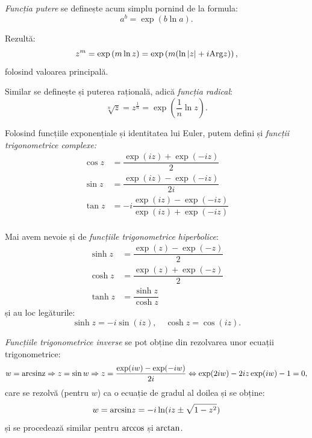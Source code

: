 \emph{Funcția putere} se definește acum simplu pornind de la formula:
\[
  a^b = \exp\left(b \ln a\right).
\]

Rezultă:
\[
  z^m = \exp\left(m \ln z\right) = \exp \left( m(\ln|z| + i\mathrm{Arg}z) \right),
\]
folosind valoarea principală.

Similar se definește și puterea rațională, adică \emph{funcția radical}:
\[
  \sqrt[n]{z} = z^{\frac{1}{n}} = \exp\left( \dfrac{1}{n} \ln z \right).
\]

Folosind funcțiile exponențiale și identitatea lui Euler, putem defini și
\emph{funcții trigonometrice complexe:}
\begin{align*}
  \cos z &= \dfrac{\exp(iz) + \exp(-iz)}{2} \\
  \sin z &= \dfrac{\exp(iz) - \exp(-iz)}{2i} \\
  \tan z &= -i\dfrac{\exp(iz) - \exp(-iz)}{\exp(iz) + \exp(-iz)} \\
\end{align*}

Mai avem nevoie și de \emph{funcțiile trigonometrice hiperbolice}:
\begin{align*}
  \sinh z &= \dfrac{\exp(z) - \exp(-z)}{2} \\
  \cosh z &= \dfrac{\exp(z) + \exp(-z)}{2} \\
  \tanh z &= \dfrac{\sinh z}{\cosh z}
\end{align*}
și au loc legăturile:
\[
  \sinh z = -i\sin(iz), \quad \cosh z = \cos(iz).
\]

\emph{Funcțiile trigonometrice inverse} se pot obține din rezolvarea unor
ecuații trigonometrice\footnotemark:
\[
  w = \dr{arcsin z} \Rightarrow z = \sin w \Rightarrow %
  z = \dfrac{\exp(iw) - \exp(-iw)}{2i} \Leftrightarrow %
  \exp(2iw) - 2iz\exp(iw) - 1 = 0,
\]
care se rezolvă (pentru $ w $) ca o ecuație de gradul al doilea și se obține:
\[
  w = \mathrm{arcsin} z = -i\ln(iz \pm \sqrt{1 - z^2})
\]
și se procedează similar pentru $ \mathrm{arccos} $ și $ \mathrm{arctan} $.




